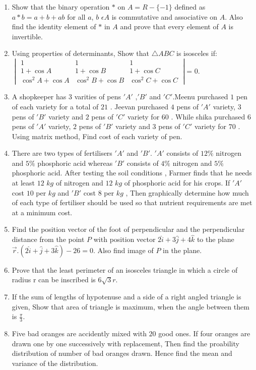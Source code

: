 \documentclass{article}
\begin{document}
\begin{enumerate}
 \item Show that the binary operation $*$ on  $A=R-\{-1\}$ defined as $a*b =a+b+ab$ for all $a$, $b$ $\epsilon A$ is commutative and associative on $A$. Also find the identity element of $*$ in $A$ and prove that every element of $A$ is invertible.
 \item Using properties of determinants, Show that $\triangle ABC$ is isosceles if: \\
$\begin{vmatrix}1 & 1 & 1 \\1 + \cos A & 1 + \cos B & 1 + \cos C \\\cos^2 A + \cos A & \cos^2 B + \cos B & \cos^2 C + \cos C
\end{vmatrix}$= $0$.
 \item A shopkeeper has $3$ varities of pens $'A'$ ,$'B'$ and $'C'$.Meenu purchased $1$ pen of each variety for a total of \rupee $21$ . Jeevan purchased $4$ pens of $'A'$ variety, $3$ pens of $'B'$ variety and $2$ pens of $'C'$ variety for \rupee $60$ . While shika purchased $6$ pens of $'A'$ variety, $2$ pens of $'B'$ variety and $3$ pens of $'C'$ variety for \rupee $70$ . Using matrix method, Find cost of each variety of pen.
 \item There are two types of fertilisers $'A'$ and $'B'$. $'A'$ consists of $12\%$ nitrogen and $5\%$ phosphoric acid whereas $'B'$ consists of $4\%$ nitrogen and $5\%$ phosphoric acid. After testing the  soil conditions , Farmer finds that he needs at least $12$ $kg$ of nitrogen and $12$ $kg$ of phosphoric acid for his crops. If $'A'$ cost \rupee $10$ per $kg$ and $'B'$ cost \rupee $8$ per $kg$ , Then graphically determine how much of each type of fertiliser should be used so that nutrient requirements are met at a minimum cost.  
\item Find the position vector of the foot of perpendicular and the perpendicular distance from the point $P$ with position vector $ 2\hat{i}+3\hat{j}+4\hat{k} $ to the plane $\overrightarrow{r}.(2\hat{i}+\hat{j}+3\hat{k})-26 =0$. Also find image of $P$ in the plane.
 \item Prove that the least perimeter of an isosceles triangle in which a circle of radius r can be inscribed is $6\sqrt{3}r$.
 \item If the sum of lengths of hypotenuse and a side of a right angled triangle is given, Show that area of triangle is maximum, when the angle between them is $\frac{\pi}{3}$.
 \item Five bad oranges are accidently mixed with $20$ good ones. If four oranges are drawn one by one successively with replacement, Then find the proability distribution of number of bad oranges drawn. Hence find the mean and variance of the distribution.
\end{enumerate}
\end{document}
